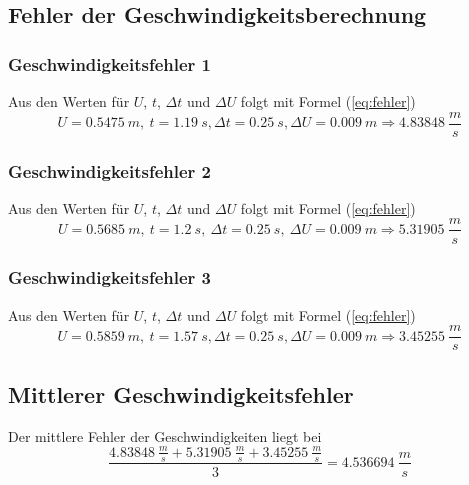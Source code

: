 \documentclass{article}
\begin{document}
        \subsection{Fehler der Geschwindigkeitsberechnung}
            \subsubsection{Geschwindigkeitsfehler 1}
                Aus den Werten für \(U\), \(t\), \( \Delta t \) und \(\Delta U \) folgt mit Formel (\ref{eq:fehler})
                \begin{equation}
                    U = \SI{0.5475}{m},\ t = \SI{1.19}{s}, \Delta t = \SI{0.25}{s}, \Delta U = \SI{0.009}{m} \Rightarrow \SI{4.83848}{\frac{m}{s}} 
                \end{equation}
            \subsubsection{Geschwindigkeitsfehler 2}
                Aus den Werten für \(U\), \(t\), \( \Delta t \) und \(\Delta U \) folgt mit Formel (\ref{eq:fehler})
                \begin{equation}
                    U = \SI{0.5685}{m},\ t = \SI{1.2}{s},\ \Delta t = \SI{0.25}{s},\ \Delta U = \SI{0.009}{m} \Rightarrow \SI{5.31905}{\frac{m}{s}} 
                \end{equation}
            \subsubsection{Geschwindigkeitsfehler 3}
                Aus den Werten für \(U\), \(t\), \( \Delta t \) und \(\Delta U \) folgt mit Formel (\ref{eq:fehler})
                \begin{equation}
                    U = \SI{0.5859}{m},\ t = \SI{1.57}{s}, \Delta t = \SI{0.25}{s}, \Delta U = \SI{0.009}{m} \Rightarrow \SI{3.45255}{\frac{m}{s}} 
                \end{equation}

        \subsection{Mittlerer Geschwindigkeitsfehler}
            Der mittlere Fehler der Geschwindigkeiten liegt bei
            \begin{equation} \label{val:geschw_fehler}
                \frac{ \SI{4.83848}{\frac{m}{s}} + \SI{5.31905}{\frac{m}{s}} + \SI{3.45255}{\frac{m}{s}} }{3} = \SI{4.536694}{\frac{m}{s}}
            \end{equation}
\end{document}
